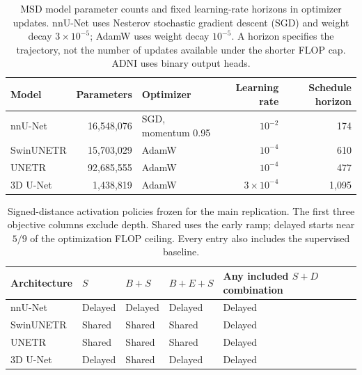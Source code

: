 \documentclass[12pt,a4paper]{article}
\begin{document}
\begin{table}[htbp]
\centering\small{}
\begin{tabular}{@{}P{2.5cm}rP{3.0cm}rr@{}}
\hline
Model & Parameters & Optimizer & Learning rate & Schedule horizon \\
\hline
nnU-Net & 16,548,076 & SGD, momentum 0.95 & $10^{-2}$ & 174 \\
SwinUNETR & 15,703,029 & AdamW & $10^{-4}$ & 610 \\
UNETR & 92,685,555 & AdamW & $10^{-4}$ & 477 \\
3D U-Net & 1,438,819 & AdamW & $3\times10^{-4}$ & 1,095 \\
\hline
\end{tabular}
\caption{MSD model parameter counts and fixed learning-rate horizons in optimizer
updates. nnU-Net uses Nesterov stochastic gradient descent (SGD) and weight decay $3\times10^{-5}$;
AdamW uses weight decay $10^{-5}$. A horizon specifies the trajectory,
not the number of updates available under the shorter FLOP cap. ADNI
uses binary output heads.}
\label{tab:main-model-settings}
\end{table}

\begin{table}[htbp]
\centering
\small
{}
\renewcommand{\arraystretch}{1.2}
\begin{tabular}{@{}P{3.0cm}P{2.0cm}P{2.2cm}P{2.7cm}P{3.8cm}@{}}
\hline
Architecture & $S$ & $B+S$ & $B+E+S$ & Any included $S+D$ combination \\
\hline
nnU-Net & Delayed & Delayed & Delayed & Delayed \\
SwinUNETR & Shared & Shared & Shared & Delayed \\
UNETR & Shared & Shared & Shared & Delayed \\
3D U-Net & Delayed & Shared & Delayed & Delayed \\
\hline
\end{tabular}
\caption{Signed-distance activation policies frozen for the main
replication. The first three objective columns exclude depth. Shared
uses the early ramp; delayed starts near $5/9$ of the optimization
FLOP ceiling. Every entry also includes the supervised baseline.}
\label{tab:sdf-activation-policies}
\end{table}
\end{document}
